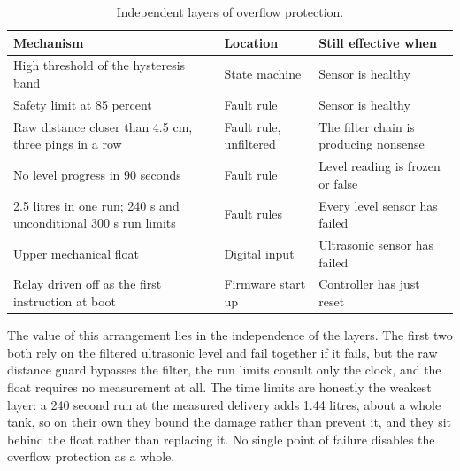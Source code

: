 \begin{table}[H]
\caption{Independent layers of overflow protection.}
\label{tab:layers}
\centering
\renewcommand{\arraystretch}{1.1}
\begin{tabular}{|p{4.6cm}|p{3.6cm}|p{4.8cm}|}
\hline
\rowcolor[HTML]{B7E1F0}
\textbf{Mechanism} & \textbf{Location} & \textbf{Still effective when} \\
\hline
High threshold of the hysteresis band & State machine & Sensor is healthy \\
\hline
Safety limit at 85 percent & Fault rule & Sensor is healthy \\
\hline
Raw distance closer than 4.5 cm, three pings in a row & Fault rule, unfiltered & The filter chain is producing nonsense \\
\hline
No level progress in 90 seconds & Fault rule & Level reading is frozen or false \\
\hline
2.5 litres in one run; 240 s and unconditional 300 s run limits & Fault rules & Every level sensor has failed \\
\hline
Upper mechanical float & Digital input & Ultrasonic sensor has failed \\
\hline
Relay driven off as the first instruction at boot & Firmware start up & Controller has just reset \\
\hline
\end{tabular}
\end{table}

The value of this arrangement lies in the independence of the layers. The first two both rely on the filtered ultrasonic level and fail together if it fails, but the raw distance guard bypasses the filter, the run limits consult only the clock, and the float requires no measurement at all. The time limits are honestly the weakest layer: a 240 second run at the measured delivery adds 1.44 litres, about a whole tank, so on their own they bound the damage rather than prevent it, and they sit behind the float rather than replacing it. No single point of failure disables the overflow protection as a whole.
